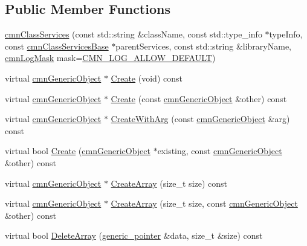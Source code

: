 \subsection*{Public Member Functions}
\begin{DoxyCompactItemize}
\item 
\hyperlink{classcmn_class_services_ae08bcbcf302b60b7303061f3a67c117c}{cmn\-Class\-Services} (const std\-::string \&class\-Name, const std\-::type\-\_\-info $\ast$type\-Info, const \hyperlink{classcmn_class_services_base}{cmn\-Class\-Services\-Base} $\ast$parent\-Services, const std\-::string \&library\-Name, \hyperlink{cmn_log_lo_d_8h_a44b6ef7560b0d204460b0a54f1a5d702}{cmn\-Log\-Mask} mask=\hyperlink{cmn_log_lo_d_8h_a941e5ff3075571f0ad1e53e1204bd856}{C\-M\-N\-\_\-\-L\-O\-G\-\_\-\-A\-L\-L\-O\-W\-\_\-\-D\-E\-F\-A\-U\-L\-T})
\item 
virtual \hyperlink{classcmn_generic_object}{cmn\-Generic\-Object} $\ast$ \hyperlink{classcmn_class_services_a2b565befb4c007fd0fce82cdc2fad865}{Create} (void) const 
\item 
virtual \hyperlink{classcmn_generic_object}{cmn\-Generic\-Object} $\ast$ \hyperlink{classcmn_class_services_a37572e1b161b28771f60d30cc72085d6}{Create} (const \hyperlink{classcmn_generic_object}{cmn\-Generic\-Object} \&other) const 
\item 
virtual \hyperlink{classcmn_generic_object}{cmn\-Generic\-Object} $\ast$ \hyperlink{classcmn_class_services_a1db1ba50cfbf06e482505b257dd90b20}{Create\-With\-Arg} (const \hyperlink{classcmn_generic_object}{cmn\-Generic\-Object} \&arg) const 
\item 
virtual bool \hyperlink{classcmn_class_services_a79461e9cafda8525bc80fc1daa29b8e8}{Create} (\hyperlink{classcmn_generic_object}{cmn\-Generic\-Object} $\ast$existing, const \hyperlink{classcmn_generic_object}{cmn\-Generic\-Object} \&other) const 
\item 
virtual \hyperlink{classcmn_generic_object}{cmn\-Generic\-Object} $\ast$ \hyperlink{classcmn_class_services_abb36ef4908f334060f17c54f4a9874be}{Create\-Array} (size\-\_\-t size) const 
\item 
virtual \hyperlink{classcmn_generic_object}{cmn\-Generic\-Object} $\ast$ \hyperlink{classcmn_class_services_aea137e364becad108d31b275287e3e96}{Create\-Array} (size\-\_\-t size, const \hyperlink{classcmn_generic_object}{cmn\-Generic\-Object} \&other) const 
\item 
virtual bool \hyperlink{classcmn_class_services_aaf95344fcb671aa86e401c7025bb7c6d}{Delete\-Array} (\hyperlink{classcmn_class_services_a350752158d6ffa3f741bcef03177f230}{generic\-\_\-pointer} \&data, size\-\_\-t \&size) const 

\end{DoxyCompactItemize}
